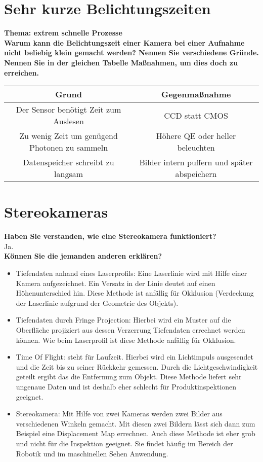 \documentclass[a4paper]{article}
\begin{document}
	\section{Sehr kurze Belichtungszeiten}
	\textbf{Thema: extrem schnelle Prozesse}\\
	\textbf{Warum kann die Belichtungszeit einer Kamera bei einer Aufnahme nicht beliebig klein
	gemacht werden? Nennen Sie verschiedene Gründe. Nennen Sie in der gleichen Tabelle
	Maßnahmen, um dies doch zu erreichen.}
	\begin{center}
		\begin{tabular}{ c|c }
			Grund & Gegenmaßnahme \\ 
			\hline
			Der Sensor benötigt Zeit zum Auslesen & CCD statt CMOS \\
			Zu wenig Zeit um genügend Photonen zu sammeln & Höhere QE oder heller beleuchten \\
			Datenspeicher schreibt zu langsam & Bilder intern puffern und später abspeichern
		\end{tabular}
	\end{center}
	
	
	
	\section{Stereokameras}
	\textbf{Haben Sie verstanden, wie eine Stereokamera funktioniert?}\\
	Ja.\\
	\textbf{Können Sie die jemanden anderen erklären?}
	\begin{itemize}
		\item Tiefendaten anhand eines Laserprofils: Eine Laserlinie wird mit Hilfe einer Kamera aufgezeichnet. Ein Versatz in der Linie deutet auf einen Höhenunterschied hin. Diese Methode ist anfällig für Okklusion (Verdeckung der Laserlinie aufgrund der Geometrie des Objekts).
		\item Tiefendaten durch Fringe Projection: Hierbei wird ein Muster auf die Oberfläche projiziert aus dessen Verzerrung Tiefendaten errechnet werden können. Wie beim Laserprofil ist diese Methode anfällig für Okklusion.
		\item Time Of Flight: steht für Laufzeit. Hierbei wird ein Lichtimpuls ausgesendet und die Zeit bis zu seiner Rückkehr gemessen. Durch die Lichtgeschwindigkeit geteilt ergibt das die Entfernung zum Objekt. Diese Methode liefert sehr ungenaue Daten und ist deshalb eher schlecht für Produktinspektionen geeignet.
		\item Stereokamera: Mit Hilfe von zwei Kameras werden zwei Bilder aus verschiedenen Winkeln gemacht. Mit diesen zwei Bildern lässt sich dann zum Beispiel eine Displacement Map errechnen. Auch diese Methode ist eher grob und nicht für die Inspektion geeignet. Sie findet häufig im Bereich der Robotik und im maschinellen Sehen Anwendung.
	\end{itemize}
	
\end{document}
